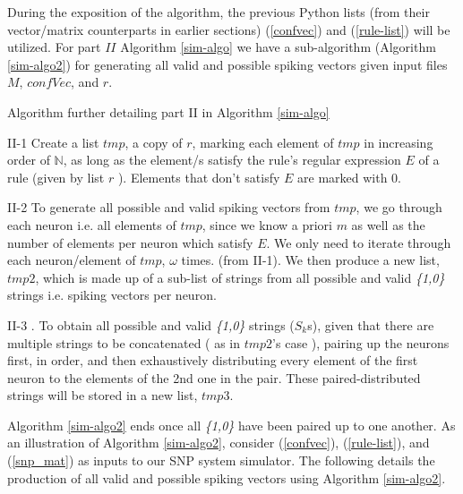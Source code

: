 \documentclass{svmultm}
\newcommand{\redmark}[1]{\color{red} #1 \color{black}}
\begin{document}
During the exposition of the algorithm, the previous Python
lists (from their vector/matrix counterparts in earlier
sections) (\ref{confvec}) and (\ref{rule-list}) will be utilized. For part $II$ Algorithm \ref{sim-algo} we have a sub-algorithm (Algorithm \ref{sim-algo2}) for generating all valid
and possible spiking vectors given input files $M$, $confVec$, and $r$.

\begin{algorithm}
\caption{Algorithm further detailing part II in Algorithm \ref{sim-algo}}
\label{sim-algo2}
\begin{algorithmic}
\item [II-1] Create a list $tmp$, a copy of $r$, marking
each element of $tmp$ in increasing order of $\mathbb N$,
as long as the element/s satisfy the rule's 
regular expression $E$ of a rule (given by list
$r$ ). Elements that don't satisfy $E$ are marked with 0.\\
 
\item [II-2] To generate all possible and valid spiking vectors from
$tmp$, we go through each neuron i.e. all elements of $tmp$,
since we know a priori $m$ as well as the number of
elements per neuron which satisfy $E$. We only need to iterate
through each neuron/element of $tmp$, $\omega$ times. 
(from II-1). We then produce a new list, $tmp2$, which is
made up of a sub-list of strings from all possible and valid
\textit{\{1,0\}} strings i.e. spiking vectors per neuron.\\

\item  [II-3]. To obtain all possible and valid \textit{\{1,0\}}
strings ($S_k$s), given that there are multiple strings
to be concatenated ( as in $tmp2$'s case ), pairing up the
neurons first, in order, and then exhaustively distributing
every element of the first neuron to the elements of the 2nd
one in the pair. These paired-distributed strings will be stored in a new list, $tmp3$.

\end{algorithmic}
\end{algorithm}

Algorithm \ref{sim-algo2} ends once all \textit{\{1,0\}} have been paired up to one another. As an illustration of Algorithm \ref{sim-algo2}, consider (\ref{confvec}), (\ref{rule-list}), and (\ref{snp_mat}) as inputs to our SNP system simulator. The following details the production of all valid and possible spiking vectors using Algorithm \ref{sim-algo2}.
\end{document}
